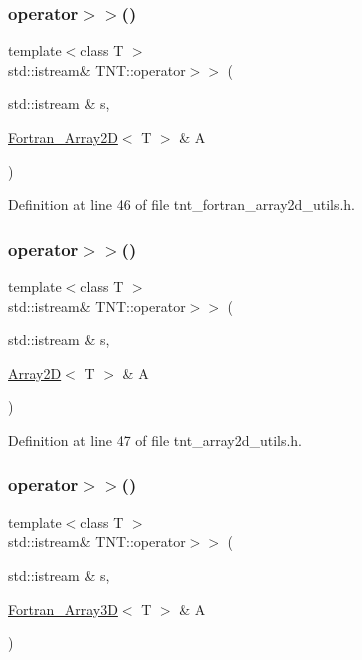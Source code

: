 \subsubsection{\texorpdfstring{operator$>$$>$()}{operator>>()}\hspace{0.1cm}{\footnotesize\ttfamily [3/7]}}
{\footnotesize\ttfamily template$<$class T $>$ \\
std\+::istream\& T\+N\+T\+::operator$>$$>$ (\begin{DoxyParamCaption}\item[{std\+::istream \&}]{s,  }\item[{\hyperlink{classTNT_1_1Fortran__Array2D}{Fortran\+\_\+\+Array2D}$<$ T $>$ \&}]{A }\end{DoxyParamCaption})}



Definition at line 46 of file tnt\+\_\+fortran\+\_\+array2d\+\_\+utils.\+h.

\mbox{\label{namespaceTNT_a2856dd71c9307b44e65cc69a98a3b102}} 
\subsubsection{\texorpdfstring{operator$>$$>$()}{operator>>()}\hspace{0.1cm}{\footnotesize\ttfamily [4/7]}}
{\footnotesize\ttfamily template$<$class T $>$ \\
std\+::istream\& T\+N\+T\+::operator$>$$>$ (\begin{DoxyParamCaption}\item[{std\+::istream \&}]{s,  }\item[{\hyperlink{classTNT_1_1Array2D}{Array2D}$<$ T $>$ \&}]{A }\end{DoxyParamCaption})}



Definition at line 47 of file tnt\+\_\+array2d\+\_\+utils.\+h.

\mbox{\label{namespaceTNT_afe6ad6c1db12c3e36ef2fc56089d3878}} 
\subsubsection{\texorpdfstring{operator$>$$>$()}{operator>>()}\hspace{0.1cm}{\footnotesize\ttfamily [5/7]}}
{\footnotesize\ttfamily template$<$class T $>$ \\
std\+::istream\& T\+N\+T\+::operator$>$$>$ (\begin{DoxyParamCaption}\item[{std\+::istream \&}]{s,  }\item[{\hyperlink{classTNT_1_1Fortran__Array3D}{Fortran\+\_\+\+Array3D}$<$ T $>$ \&}]{A }\end{DoxyParamCaption})}



